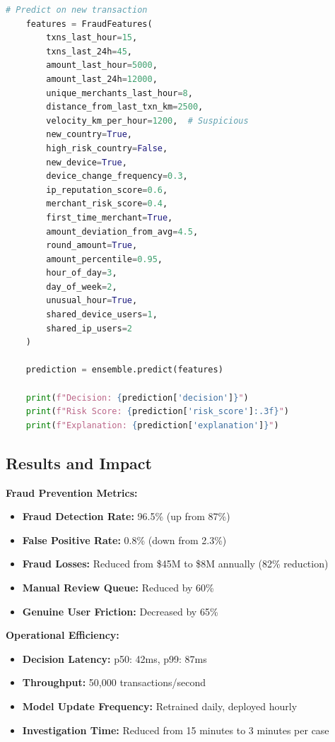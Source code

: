 \begin{lstlisting}[language=Python, caption=Ensemble Fraud Detection Models]
    # Predict on new transaction
    features = FraudFeatures(
        txns_last_hour=15,
        txns_last_24h=45,
        amount_last_hour=5000,
        amount_last_24h=12000,
        unique_merchants_last_hour=8,
        distance_from_last_txn_km=2500,
        velocity_km_per_hour=1200,  # Suspicious
        new_country=True,
        high_risk_country=False,
        new_device=True,
        device_change_frequency=0.3,
        ip_reputation_score=0.6,
        merchant_risk_score=0.4,
        first_time_merchant=True,
        amount_deviation_from_avg=4.5,
        round_amount=True,
        amount_percentile=0.95,
        hour_of_day=3,
        day_of_week=2,
        unusual_hour=True,
        shared_device_users=1,
        shared_ip_users=2
    )

    prediction = ensemble.predict(features)

    print(f"Decision: {prediction['decision']}")
    print(f"Risk Score: {prediction['risk_score']:.3f}")
    print(f"Explanation: {prediction['explanation']}")
\end{lstlisting}

\subsection{Results and Impact}

\textbf{Fraud Prevention Metrics:}

\begin{itemize}
    \item \textbf{Fraud Detection Rate:} 96.5\% (up from 87\%)
    \item \textbf{False Positive Rate:} 0.8\% (down from 2.3\%)
    \item \textbf{Fraud Losses:} Reduced from \$45M to \$8M annually (82\% reduction)
    \item \textbf{Manual Review Queue:} Reduced by 60\%
    \item \textbf{Genuine User Friction:} Decreased by 65\%
\end{itemize}

\textbf{Operational Efficiency:}

\begin{itemize}
    \item \textbf{Decision Latency:} p50: 42ms, p99: 87ms
    \item \textbf{Throughput:} 50,000 transactions/second
    \item \textbf{Model Update Frequency:} Retrained daily, deployed hourly
    \item \textbf{Investigation Time:} Reduced from 15 minutes to 3 minutes per case
\end{itemize}

